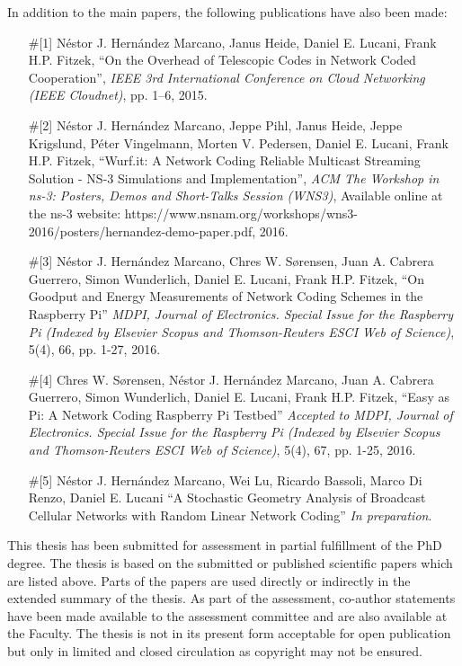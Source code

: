 \noindent In addition to the main papers, the following publications have also been made:
\begin{itemize}

  \item[\#{[1]}] N\'estor J. Hern\'andez Marcano, Janus Heide, Daniel E. Lucani, Frank H.P. Fitzek, ``On the Overhead of Telescopic Codes in Network Coded Cooperation'', \emph{IEEE 3rd International Conference on Cloud Networking (IEEE Cloudnet)}, pp. 1--6, 2015.

  \item[\#{[2]}] N\'estor J. Hern\'andez Marcano, Jeppe Pihl, Janus Heide, Jeppe Krigslund, P\'eter Vingelmann, Morten V. Pedersen, Daniel E. Lucani, Frank H.P. Fitzek, ``Wurf.it: A Network Coding Reliable Multicast Streaming Solution - NS-3 Simulations and Implementation'', \emph{ACM The Workshop in ns-3: Posters, Demos and Short-Talks Session (WNS3)}, Available online at the ns-3 website: https://www.nsnam.org/workshops/wns3-2016/posters/hernandez-demo-paper.pdf, 2016.

  \item[\#{[3]}] N\'estor J. Hern\'andez Marcano, Chres W. S\o rensen, Juan A. Cabrera Guerrero, Simon Wunderlich, Daniel E. Lucani, Frank H.P. Fitzek, ``On Goodput and Energy Measurements of Network Coding Schemes in the Raspberry Pi'' \emph{MDPI, Journal of Electronics. Special Issue for the Raspberry Pi (Indexed by Elsevier Scopus and Thomson-Reuters ESCI Web of Science)}, 5(4), 66, pp. 1-27, 2016.

  \item[\#{[4]}] Chres W. S\o rensen, N\'estor J. Hern\'andez Marcano, Juan A. Cabrera Guerrero, Simon Wunderlich, Daniel E. Lucani, Frank H.P. Fitzek, ``Easy as Pi: A Network Coding Raspberry Pi Testbed'' \emph{Accepted to MDPI, Journal of Electronics. Special Issue for the Raspberry Pi (Indexed by Elsevier Scopus and Thomson-Reuters ESCI Web of Science)}, 5(4), 67, pp. 1-25, 2016.

  \item[\#{[5]}] N\'estor J. Hern\'andez Marcano, Wei Lu, Ricardo Bassoli, Marco Di Renzo, Daniel E. Lucani ``A Stochastic Geometry Analysis of Broadcast Cellular Networks with Random Linear Network Coding'' \emph{In preparation}.

\end{itemize}

\noindent This thesis has been submitted for assessment in partial fulfillment of the PhD degree. The thesis is based on the submitted or published scientific papers which are listed above. Parts of the papers are used directly or indirectly in the extended summary of the thesis. As part of the assessment, co-author statements have been made available to the assessment committee and are also available at the Faculty. The thesis is not in its present form acceptable for open publication but only in limited and closed circulation as copyright may not be ensured.